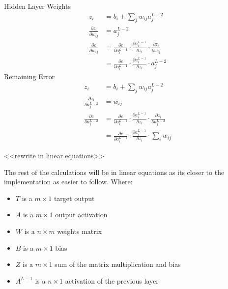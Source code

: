 Hidden Layer Weights
\begin{equation}
    \begin{aligned}
        z_{i} &= b_{i} + \sum_{j} w_{ij}a_{j}^{L-2} \\
        \frac{\partial z_{i}}{\partial w_{ij}} &= a_{j}^{L-2}\\[2em]
        \frac{\partial c}{\partial w_{ij}} &= \frac{\partial c}{\partial a_{i}^{L-1}} \cdot \frac{\partial a_{i}^{L-1}}{\partial z_{i}} \cdot  \frac{\partial z_{i}}{\partial w_{ij}} \\
                                          &= \frac{\partial c}{\partial a_{i}^{L-1}} \cdot \frac{\partial a_{i}^{L-1}}{\partial z_{i}} \cdot  a_{j}^{L-2}
    \end{aligned}
\end{equation}
Remaining Error
\begin{equation}
    \begin{aligned}
        z_{i} &= b_{i} + \sum_{j} w_{ij}a_{j}^{L-2} \\
        \frac{\partial z_{i}}{\partial a_{j}^{L-2}} &= w_{ij}\\[2em]
        \frac{\partial c}{\partial a_{j}^{L-2}} &= \frac{\partial c}{\partial a_{i}^{L-1}} \cdot \frac{\partial a_{i}^{L-1}}{\partial z_{i}} \cdot  \frac{\partial z_{i}}{\partial a_{j}^{L-2}} \\
                                          &= \frac{\partial c}{\partial a_{i}^{L-1}} \cdot \frac{\partial a_{i}^{L-1}}{\partial z_{i}} \cdot  \sum_{i} w_{ij}
    \end{aligned}
\end{equation}


<<rewrite in linear equations>>

The rest of the calculations will be in linear equations as its closer to the
implementation as easier to follow.
Where:
\begin{itemize}
    \item \( T \) is a \( m \times 1 \) target output
    \item \( A \) is a  \( m \times 1 \) output activation
    \item \( W \) is a \( n \times m \) weights matrix
    \item \( B \) is a \( m \times 1 \) bias
    \item \( Z \) is a \( m \times 1 \) sum of the matrix multiplication and bias
    \item \(A^{L-1} \) is a \( n \times 1 \) activation of the previous layer
\end{itemize}

